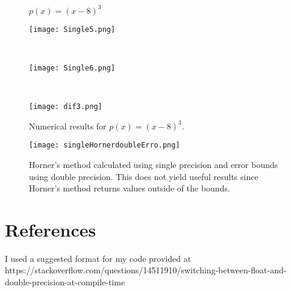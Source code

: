 \documentclass[12pt]{article}
\def\LW{\dimexpr.25\linewidth-.5em}
\theoremstyle{remark}
\begin{document}
\begin{figure}
	\vspace{-2.2cm}
	\begin{center}
		{\LARGE $p(x) = (x-8)^3$}
	\end{center}
	\parbox{\LW}{\texttt{[image: Single5.png]}}\hfill%
	\parbox{\LW}{}\hfill \\
	\parbox{\LW}{\texttt{[image: Single6.png]}}\hfill%
	\parbox{\LW}{} \\	\parbox{\LW}{\texttt{[image: dif3.png]}}\hfill%
	\parbox{\LW}{}
	\caption{Numerical results for $p(x) = (x-8)^3$.}
\end{figure}  

\newpage

\begin{figure}[H]
	\centering
	\texttt{[image: singleHornerdoubleErro.png]}
	\caption{Horner's method calculated using single precision and error bounds using double precision. This does not yield useful results since Horner's method returns values outside of the bounds.}
\end{figure}

\section{References}

I used a suggested format for my code provided at \\

https://stackoverflow.com/questions/14511910/switching-between-float-and-double-precision-at-compile-time
\end{document}
